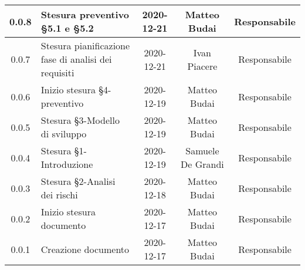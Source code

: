 \begin{center}
\begin{longtable}{|c|p{5cm}|c|c|c|}
	\hline
	0.0.8 & Stesura preventivo §5.1 e §5.2 & 2020-12-21 & Matteo Budai & Responsabile \\
	\hline
	0.0.7 & Stesura pianificazione fase di analisi dei requisiti & 2020-12-21 & Ivan Piacere & Responsabile \\
	\hline
	0.0.6 & Inizio stesura §4-preventivo & 2020-12-19 & Matteo Budai & Responsabile \\
	\hline
	0.0.5 & Stesura §3-Modello di sviluppo & 2020-12-19 & Matteo Budai & Responsabile \\
	\hline
	0.0.4 & Stesura §1-Introduzione & 2020-12-19 & Samuele De Grandi & Responsabile \\
	\hline
	0.0.3 & Stesura §2-Analisi dei rischi & 2020-12-18 & Matteo Budai & Responsabile \\
	\hline
	0.0.2 & Inizio stesura documento & 2020-12-17 & Matteo Budai & Responsabile \\
	\hline
	0.0.1 & Creazione documento & 2020-12-17 & Matteo Budai & Responsabile \\
	\hline

	\end{longtable}
\end{center}